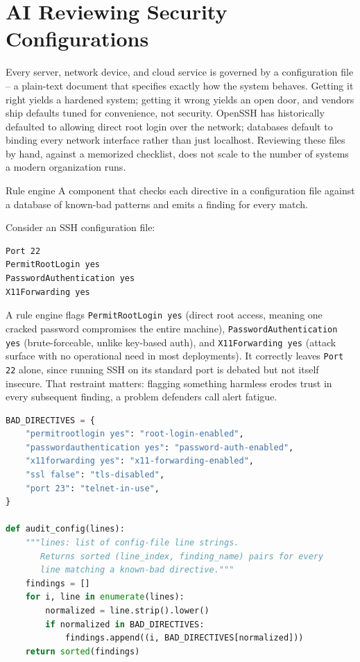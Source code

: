 \section{AI Reviewing Security Configurations}

Every server, network device, and cloud service is governed by a configuration file -- a
plain-text document that specifies exactly how the system behaves. Getting it right yields a
hardened system; getting it wrong yields an open door, and vendors ship defaults tuned for
convenience, not security. OpenSSH has historically defaulted to allowing direct root login over
the network; databases default to binding every network interface rather than just localhost.
Reviewing these files by hand, against a memorized checklist, does not scale to the number of
systems a modern organization runs.

\begin{definition}{Rule engine}
A component that checks each directive in a configuration file against a database of known-bad
patterns and emits a finding for every match.
\end{definition}

Consider an SSH configuration file:
\begin{lstlisting}[caption={A misconfigured SSH server}]
Port 22
PermitRootLogin yes
PasswordAuthentication yes
X11Forwarding yes
\end{lstlisting}
A rule engine flags \texttt{PermitRootLogin yes} (direct root access, meaning one cracked
password compromises the entire machine), \texttt{PasswordAuthentication yes} (brute-forceable,
unlike key-based auth), and \texttt{X11Forwarding yes} (attack surface with no operational need
in most deployments). It correctly leaves \texttt{Port 22} alone, since running SSH on its
standard port is debated but not itself insecure. That restraint matters: flagging something
harmless erodes trust in every subsequent finding, a problem defenders call alert fatigue.

\begin{lstlisting}[language=Python, caption={A rule-engine config auditor}]
BAD_DIRECTIVES = {
    "permitrootlogin yes": "root-login-enabled",
    "passwordauthentication yes": "password-auth-enabled",
    "x11forwarding yes": "x11-forwarding-enabled",
    "ssl false": "tls-disabled",
    "port 23": "telnet-in-use",
}

def audit_config(lines):
    """lines: list of config-file line strings.
       Returns sorted (line_index, finding_name) pairs for every
       line matching a known-bad directive."""
    findings = []
    for i, line in enumerate(lines):
        normalized = line.strip().lower()
        if normalized in BAD_DIRECTIVES:
            findings.append((i, BAD_DIRECTIVES[normalized]))
    return sorted(findings)
\end{lstlisting}

